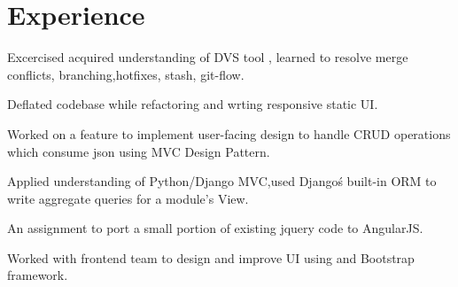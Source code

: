 \documentclass[hidelinks]{deedy-resume-openfont}
\renewcommand{\sectionsep}[0]{\vspace{8pt}}
\begin{document}
\begin{minipage}[t]{0.33\textwidth}





%

\end{minipage}
\hfill
\begin{minipage}[t]{0.66\textwidth}


\section{Experience}

\vspace{\topsep} %
\begin{tightemize}
\item  Excercised acquired understanding of DVS tool , learned to resolve merge conflicts, branching,hotfixes, stash, git-flow.
\item Deflated codebase while refactoring and wrting responsive static UI.
\item  Worked on a feature to implement user-facing design to handle CRUD
operations which consume json using MVC Design Pattern.
\item Applied understanding of Python/Django MVC,used Django\'s built-in ORM to write
  aggregate queries for a module's View.
\item An assignment to port a small portion of existing jquery code to AngularJS.
\end{tightemize}
\sectionsep

\begin{tightemize}
\item Worked with frontend team to design and improve UI using  and Bootstrap framework.
\end{tightemize}
\sectionsep


\end{minipage}
\end{document}
